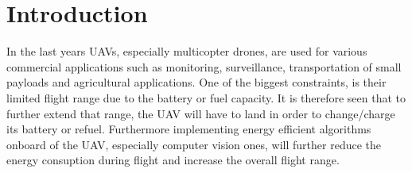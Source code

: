 \documentclass[conference]{IEEEtran}
\begin{document}
\section{Introduction}
\label{sec:introduction}
In the last years UAVs, especially multicopter drones, are used for 
various commercial applications such as monitoring, surveillance, transportation of small payloads 
and agricultural applications.
One of the biggest constraints, is their limited flight range due to the battery or fuel capacity. 
It is therefore seen that to further extend that range, the UAV will have to land in order to 
change/charge its battery or refuel. 
Furthermore implementing energy efficient algorithms onboard of the UAV, especially computer vision ones, will further reduce the energy consuption 
during flight 
and increase the overall flight range. 
\end{document}
